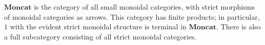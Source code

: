 $\mathbf{Moncat}$ is the category of all small monoidal categories, with strict morphisms of monoidal categories as arrows. This category has finite products; in particular, $1$ with the evident strict monoidal structure is terminal in $\mathbf{Moncat}$. There is also a full subcategory consisting of all strict monoidal categories.
